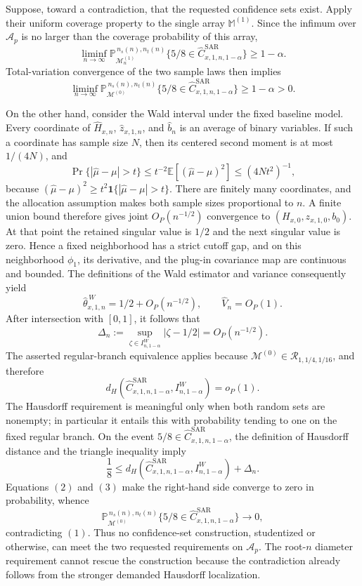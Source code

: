 Suppose, toward a contradiction, that the requested confidence sets exist.  Apply their uniform coverage property to the single array \(\mathbb M^{(1)}\).  Since the infimum over \(\mathcal A_p\) is no larger than the coverage probability of this array,
\[
\liminf_{n\to\infty}
\mathbb P_{\mathcal M^{(1)}_n}^{\,n_s(n),n_t(n)}
\{5/8\in\widehat C^{\mathrm{SAR}}_{x,1,n,1-\alpha}\}
\ge1-\alpha.
\]
Total-variation convergence of the two sample laws then implies
\[
\liminf_{n\to\infty}
\mathbb P_{\mathcal M^{(0)}}^{\,n_s(n),n_t(n)}
\{5/8\in\widehat C^{\mathrm{SAR}}_{x,1,n,1-\alpha}\}
\ge1-\alpha>0. \tag{1}
\]

On the other hand, consider the Wald interval under the fixed baseline model.  Every coordinate of \(\widehat H_{x,n}\), \(\widehat z_{x,1,n}\), and \(\widehat b_n\) is an average of binary variables.  If such a coordinate has sample size \(N\), then its centered second moment is at most \(1/(4N)\), and
\[
\Pr\{|\widehat\mu-\mu|>t\}
\le t^{-2}\mathbb E[(\widehat\mu-\mu)^2]
\le(4Nt^2)^{-1},
\]
because \((\widehat\mu-\mu)^2\ge
t^2\mathbf 1\{|\widehat\mu-\mu|>t\}\).  There are finitely many coordinates, and the allocation assumption makes both sample sizes proportional to \(n\).  A finite union bound therefore gives joint \(O_P(n^{-1/2})\) convergence to \((H_{x,0},z_{x,1,0},b_0)\).  At that point the retained singular value is \(1/2\) and the next singular value is zero.  Hence a fixed neighborhood has a strict cutoff gap, and on this neighborhood \(\phi_1\), its derivative, and the plug-in covariance map are continuous and bounded.  The definitions of the Wald estimator and variance consequently yield
\[
\widehat\theta^{\,W}_{x,1,n}=1/2+O_P(n^{-1/2}),\qquad
\widehat V_n=O_P(1).
\]
After intersection with \([0,1]\), it follows that
\[
\Delta_n:=\sup_{\zeta\in I^W_{n,1-\alpha}}|\zeta-1/2|
=O_P(n^{-1/2}). \tag{2}
\]
The asserted regular-branch equivalence applies because \(\mathcal M^{(0)}\in\mathcal R_{1,1/4,1/16}\), and therefore
\[
d_H\!\left(\widehat C^{\mathrm{SAR}}_{x,1,n,1-\alpha},I^W_{n,1-\alpha}\right)=o_P(1). \tag{3}
\]
The Hausdorff requirement is meaningful only when both random sets are nonempty; in particular it entails this with probability tending to one on the fixed regular branch.  On the event \(5/8\in\widehat C^{\mathrm{SAR}}_{x,1,n,1-\alpha}\), the definition of Hausdorff distance and the triangle inequality imply
\[
\frac18
\le d_H\!\left(\widehat C^{\mathrm{SAR}}_{x,1,n,1-\alpha},I^W_{n,1-\alpha}\right)+\Delta_n.
\]
Equations \((2)\) and \((3)\) make the right-hand side converge to zero in probability, whence
\[
\mathbb P_{\mathcal M^{(0)}}^{\,n_s(n),n_t(n)}
\{5/8\in\widehat C^{\mathrm{SAR}}_{x,1,n,1-\alpha}\}\longrightarrow0,
\]
contradicting \((1)\).  Thus no confidence-set construction, studentized or otherwise, can meet the two requested requirements on \(\mathcal A_p\).  The root-\(n\) diameter requirement cannot rescue the construction because the contradiction already follows from the stronger demanded Hausdorff localization.

